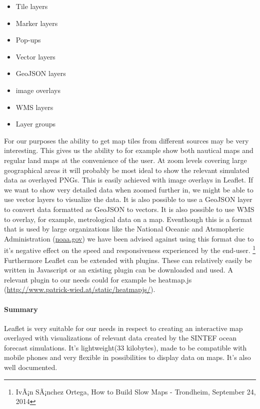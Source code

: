 \documentclass[11pt,a4paper,titlepage,oneside]{report}
\begin{document}
    \begin{itemize}
      \item Tile layers
      \item Marker layers
      \item Pop-ups
      \item Vector layers
      \item GeoJSON layers
      \item image overlays
      \item \gls{WMS} layers
      \item Layer groups
    \end{itemize}

    For our purposes the ability to get map tiles from different sources may be very interesting. This gives us the ability to for example show both nautical maps and regular land maps at the convenience of the user. At zoom levels covering large geographical areas it will probably be most ideal to show the relevant simulated data as overlayed PNGs. This is easily achieved with image overlays in Leaflet. If we want to show very detailed data when zoomed further in, we might be able to use vector layers to visualize the data. It is also possible to use a GeoJSON layer to convert data formatted as GeoJSON to vectors.
    It is also possible to use \gls{WMS} to overlay, for example, metrological data on a map. Eventhough this is a format that is used by large organizations like the National Oceanic and Atsmopheric Administration (\url{noaa.gov}) we have been advised against using this format due to it's negative effect on the speed and responsiveness experienced by the end-user. \footnote{IvÃ¡n SÃ¡nchez Ortega, How to Build Slow Maps - Trondheim, September 24, 2014}
    Furthermore Leaflet can be extended with plugins. These can relatively easily be written in Javascript or an existing plugin can be downloaded and used. A relevant plugin to our needs could for example be heatmap.js (\url{http://www.patrick-wied.at/static/heatmapjs/}).

    \paragraph{Summary}
    Leaflet is very suitable for our needs in respect to creating an interactive map overlayed with visualizations of relevant data created by the SINTEF ocean forecast simulations. It's lightweight(33 kilobytes), made to be compatible with mobile phones and very flexible in possibilities to display data on maps. It's also well documented.
\end{document}
